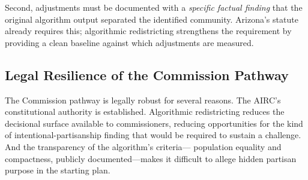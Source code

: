 Second, adjustments must be documented with a \emph{specific factual finding}
that the original algorithm output separated the identified community.
Arizona's statute already requires this; algorithmic redistricting strengthens
the requirement by providing a clean baseline against which adjustments are
measured.

\subsection{Legal Resilience of the Commission Pathway}

The Commission pathway is legally robust for several reasons.  The AIRC's
constitutional authority is established.  Algorithmic redistricting reduces
the decisional surface available to commissioners, reducing opportunities
for the kind of intentional-partisanship finding that would be required to
sustain a challenge.  And the transparency of the algorithm's criteria---
population equality and compactness, publicly documented---makes it difficult
to allege hidden partisan purpose in the starting plan.

